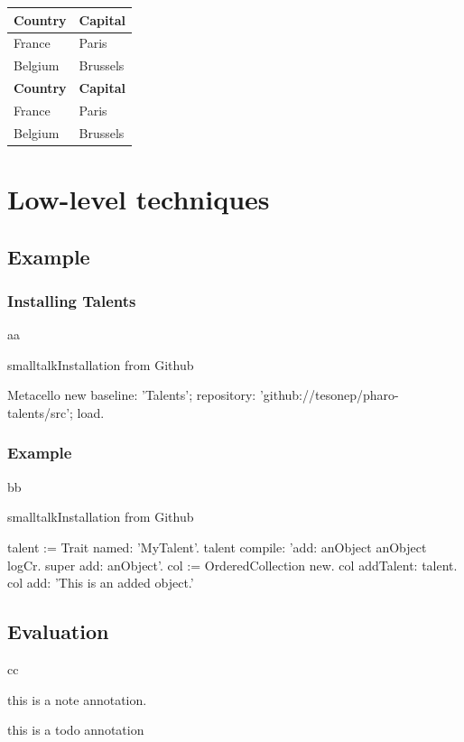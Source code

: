 \documentclass[10pt,twoside,english]{_support/latex/sbabook/sbabook}
\begin{document}
\begin{tabular}{ll}
\toprule
\textbf{Country} & \textbf{Capital} \\
\midrule
France & Paris \\
Belgium & Brussels \\
\textbf{Country} & \textbf{Capital} \\
\midrule
France & Paris \\
Belgium & Brussels \\
\bottomrule
\end{tabular}
\chapter{Low-level techniques}\section{Example}\subsection{Installing Talents}
aa

\begin{listing}[float, label=install]{smalltalk}{Installation from Github}

Metacello new
  baseline: 'Talents';
  repository: 'github://tesonep/pharo-talents/src';
  load.
\end{listing}
\subsection{Example}
bb

\begin{listing}[float, label=talent-example]{smalltalk}{Installation from Github}

talent := Trait named: 'MyTalent'.
talent compile: 'add: anObject
anObject logCr.
super add: anObject'.
col := OrderedCollection new.
col addTalent: talent.
col add: 'This is an added object.'
\end{listing}
\section{Evaluation}
cc

\begin{note}
this is a note annotation.
\end{note}

\begin{todo}
this is a todo annotation
\end{todo}
\end{document}
